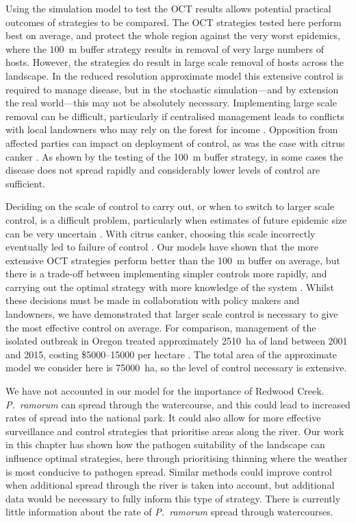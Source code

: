 Using the simulation model to test the OCT results allows potential practical outcomes of strategies to be compared. The OCT strategies tested here perform best on average, and protect the whole region against the very worst epidemics, where the \SI{100}{\meter} buffer strategy results in removal of very large numbers of hosts. However, the strategies do result in large scale removal of hosts across the landscape. In the reduced resolution approximate model this extensive control is required to manage disease, but in the stochastic simulation---and by extension the real world---this may not be absolutely necessary. Implementing large scale removal can be difficult, particularly if centralised management leads to conflicts with local landowners who may rely on the forest for income \citep{alexander_lessons_2010}. Opposition from affected parties can impact on deployment of control, as was the case with citrus canker \citep{gottwald_citrus_2007}. As shown by the testing of the \SI{100}{\meter} buffer strategy, in some cases the disease does not spread rapidly and considerably lower levels of control are sufficient. 

Deciding on the scale of control to carry out, or when to switch to larger scale control, is a difficult problem, particularly when estimates of future epidemic size can be very uncertain \citep{neri_bayesian_2014}. With citrus canker, choosing this scale incorrectly eventually led to failure of control \citep{gottwald_citrus_2007}. Our models have shown that the more extensive OCT strategies perform better than the \SI{100}{\meter} buffer on average, but there is a trade-off between implementing simpler controls more rapidly, and carrying out the optimal strategy with more knowledge of the system \citep{thompson_control_2018}. Whilst these decisions must be made in collaboration with policy makers and landowners, we have demonstrated that larger scale control is necessary to give the most effective control on average. For comparison, management of the isolated outbreak in Oregon treated approximately \SI{2510}{\hectare} of land between 2001 and 2015, costing \$5000--15000 per hectare \citep{goheen_sudden_2017}. The total area of the approximate model we consider here is \SI{75000}{\hectare}, so the level of control necessary is extensive.

We have not accounted in our model for the importance of Redwood Creek. \emph{P.~ramorum} can spread through the watercourse, and this could lead to increased rates of spread into the national park. It could also allow for more effective surveillance and control strategies that prioritise areas along the river. Our work in this chapter has shown how the pathogen suitability of the landscape can influence optimal strategies, here through prioritising thinning where the weather is most conducive to pathogen spread. Similar methods could improve control when additional spread through the river is taken into account, but additional data would be necessary to fully inform this type of strategy. There is currently little information about the rate of \emph{P.~ramorum} spread through watercourses.

